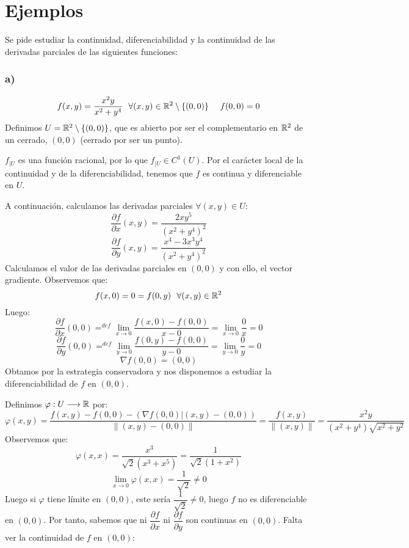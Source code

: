 \section{Ejemplos}
\noindent
Se pide estudiar la continuidad, diferenciabilidad y la continuidad de las derivadas parciales de las siguientes funciones:

\subsubsection{a)}
$$f(x,y) = \dfrac{x^2y}{x^2+y^4}~~\forall (x,y) \in \mathbb R^2 \setminus \{(0,0)\}~~~~f(0,0) = 0$$
Definimos $U = \mathbb R^2 \setminus \{(0,0)\}$, que es abierto por ser el complementario en $\mathbb R^2$ de un cerrado, ${(0,0)}$ (cerrado por ser un punto).
\vspace{.5cm}

\noindent
$f_{|U}$ es una función racional, por lo que $f_{|U} \in C^1(U)$. Por el carácter local de la continuidad y de la diferenciabilidad, tenemos que $f$ es continua y diferenciable en $U$.
\vspace{.5cm}

\noindent
A continuación, calculamos las derivadas parciales $\forall (x,y) \in U$:
$$\dfrac{\partial f}{\partial x}(x,y) = \dfrac{2xy^5}{(x^2+y^4)^2}$$
$$\dfrac{\partial f}{\partial y}(x,y) = \dfrac{x^4-3x^3y^4}{(x^2+y^4)^2}$$
Calculamos el valor de las derivadas parciales en $(0,0)$ y con ello, el vector gradiente. Observemos que:
$$f(x,0) = 0 = f(0,y)~~\forall(x,y) \in \mathbb R^2$$
Luego:
$$\dfrac{\partial f}{\partial x}(0,0) \mathop{=}^{def} \lim_{x \to 0} \dfrac{f(x,0)-f(0,0)}{x-0} = \lim_{x \to 0} \dfrac{0}{x} = 0$$
$$\dfrac{\partial f}{\partial y}(0,0) \mathop{=}^{def} \lim_{y \to 0} \dfrac{f(0,y)-f(0,0)}{y-0} = \lim_{y \to 0} \dfrac{0}{y} = 0$$
$$\nabla f(0,0) = (0,0)$$
Obtamos por la estrategia conservadora y nos disponemos a estudiar la diferenciabilidad de $f$ en $(0,0)$.
\vspace{.5cm}

Definimos $\varphi:U \longrightarrow \mathbb R$ por: 
$$\varphi(x,y) = \dfrac{f(x,y)-f(0,0)-\left(\nabla f(0,0)|(x,y)-(0,0)\right)}{\|(x,y)-(0,0)\|} =\dfrac{f(x,y)}{\|(x,y)\|}=\dfrac{x^2y}{(x^2+y^4)\sqrt{x^2+y^2}}$$
Observemos que:
$$\varphi(x,x) = \dfrac{x^3}{\sqrt{2}(x^3+x^5)} = \dfrac{1}{\sqrt{2}(1+x^2)}$$
$$\lim_{x \to 0}\varphi(x,x) = \dfrac{1}{\sqrt{2}} \neq 0$$
Luego si $\varphi$ tiene límite en $(0,0)$, este sería $\dfrac{1}{\sqrt{2}} \neq 0$, luego $f$ no es diferenciable en $(0,0)$. Por tanto, sabemos que ni $\dfrac{\partial f}{\partial x}$ ni $\dfrac{\partial f}{\partial y}$ son continuas en $(0,0)$. Falta ver la continuidad de $f$ en $(0,0)$:

